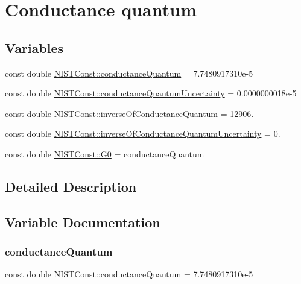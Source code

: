 \hypertarget{group___conductance_quantum}{}\section{Conductance quantum}
\label{group___conductance_quantum}
\subsection*{Variables}
\begin{DoxyCompactItemize}
\item 
const double \hyperlink{group___conductance_quantum_gac57088a56b37d0b899d3e9c9babaadaf}{N\+I\+S\+T\+Const\+::conductance\+Quantum} = 7.\+7480917310e-\/5
\item 
const double \hyperlink{group___conductance_quantum_ga599b808b8a742da1bb97cdb68f65cbf9}{N\+I\+S\+T\+Const\+::conductance\+Quantum\+Uncertainty} = 0.\+0000000018e-\/5
\item 
const double \hyperlink{group___conductance_quantum_ga39f726a47f146a434d7fca49fc2aeb30}{N\+I\+S\+T\+Const\+::inverse\+Of\+Conductance\+Quantum} = 12906.
\item 
const double \hyperlink{group___conductance_quantum_ga952c117f8b62615110f13d95c70075cd}{N\+I\+S\+T\+Const\+::inverse\+Of\+Conductance\+Quantum\+Uncertainty} = 0.
\item 
const double \hyperlink{group___conductance_quantum_ga04bee7105fe6a217430a2db2913e7754}{N\+I\+S\+T\+Const\+::\+G0} = conductance\+Quantum
\end{DoxyCompactItemize}


\subsection{Detailed Description}


\subsection{Variable Documentation}
\mbox{\label{group___conductance_quantum_gac57088a56b37d0b899d3e9c9babaadaf}} 
\subsubsection{\texorpdfstring{conductance\+Quantum}{conductanceQuantum}}
{\footnotesize\ttfamily const double N\+I\+S\+T\+Const\+::conductance\+Quantum = 7.\+7480917310e-\/5}

